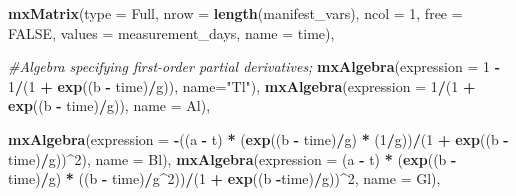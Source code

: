 \documentclass[
12pt, %
twoside,
english]{guelphthesis}
\newenvironment{Shaded}{\begin{snugshade}}{\end{snugshade}}
\newcommand{\AttributeTok}[1]{\textcolor[rgb]{0.13,0.29,0.53}{#1}}
\newcommand{\CommentTok}[1]{\textcolor[rgb]{0.56,0.35,0.01}{\textit{#1}}}
\newcommand{\ConstantTok}[1]{\textcolor[rgb]{0.56,0.35,0.01}{#1}}
\newcommand{\DecValTok}[1]{\textcolor[rgb]{0.00,0.00,0.81}{#1}}
\newcommand{\FunctionTok}[1]{\textcolor[rgb]{0.13,0.29,0.53}{\textbf{#1}}}
\newcommand{\NormalTok}[1]{#1}
\newcommand{\SpecialCharTok}[1]{\textcolor[rgb]{0.81,0.36,0.00}{\textbf{#1}}}
\newcommand{\StringTok}[1]{\textcolor[rgb]{0.31,0.60,0.02}{#1}}
\begin{document}
\begin{Shaded}
\begin{Highlighting}[numbers=left,,]
  \FunctionTok{mxMatrix}\NormalTok{(}\AttributeTok{type =} \StringTok{\textquotesingle{}Full\textquotesingle{}}\NormalTok{, }\AttributeTok{nrow =} \FunctionTok{length}\NormalTok{(manifest\_vars), }\AttributeTok{ncol =} \DecValTok{1}\NormalTok{, }\AttributeTok{free =} \ConstantTok{FALSE}\NormalTok{, }
           \AttributeTok{values =}\NormalTok{ measurement\_days, }\AttributeTok{name =} \StringTok{\textquotesingle{}time\textquotesingle{}}\NormalTok{),}
  
  \CommentTok{\#Algebra specifying first{-}order partial derivatives; }
  \FunctionTok{mxAlgebra}\NormalTok{(}\AttributeTok{expression =} \DecValTok{1} \SpecialCharTok{{-}} \DecValTok{1}\SpecialCharTok{/}\NormalTok{(}\DecValTok{1} \SpecialCharTok{+} \FunctionTok{exp}\NormalTok{((b }\SpecialCharTok{{-}}\NormalTok{ time)}\SpecialCharTok{/}\NormalTok{g)), }\AttributeTok{name=}\StringTok{"Tl"}\NormalTok{),}
  \FunctionTok{mxAlgebra}\NormalTok{(}\AttributeTok{expression =} \DecValTok{1}\SpecialCharTok{/}\NormalTok{(}\DecValTok{1} \SpecialCharTok{+} \FunctionTok{exp}\NormalTok{((b }\SpecialCharTok{{-}}\NormalTok{ time)}\SpecialCharTok{/}\NormalTok{g)), }\AttributeTok{name =} \StringTok{\textquotesingle{}Al\textquotesingle{}}\NormalTok{), }
  
  \FunctionTok{mxAlgebra}\NormalTok{(}\AttributeTok{expression =} \SpecialCharTok{{-}}\NormalTok{((a }\SpecialCharTok{{-}}\NormalTok{ t) }\SpecialCharTok{*}\NormalTok{ (}\FunctionTok{exp}\NormalTok{((b }\SpecialCharTok{{-}}\NormalTok{ time)}\SpecialCharTok{/}\NormalTok{g) }\SpecialCharTok{*}\NormalTok{ (}\DecValTok{1}\SpecialCharTok{/}\NormalTok{g))}\SpecialCharTok{/}\NormalTok{(}\DecValTok{1} \SpecialCharTok{+} \FunctionTok{exp}\NormalTok{((b }\SpecialCharTok{{-}}\NormalTok{ time)}\SpecialCharTok{/}\NormalTok{g))}\SpecialCharTok{\^{}}\DecValTok{2}\NormalTok{), }\AttributeTok{name =} \StringTok{\textquotesingle{}Bl\textquotesingle{}}\NormalTok{),}
  \FunctionTok{mxAlgebra}\NormalTok{(}\AttributeTok{expression =}\NormalTok{  (a }\SpecialCharTok{{-}}\NormalTok{ t) }\SpecialCharTok{*}\NormalTok{ (}\FunctionTok{exp}\NormalTok{((b }\SpecialCharTok{{-}}\NormalTok{ time)}\SpecialCharTok{/}\NormalTok{g) }\SpecialCharTok{*}\NormalTok{ ((b }\SpecialCharTok{{-}}\NormalTok{ time)}\SpecialCharTok{/}\NormalTok{g}\SpecialCharTok{\^{}}\DecValTok{2}\NormalTok{))}\SpecialCharTok{/}\NormalTok{(}\DecValTok{1} \SpecialCharTok{+} \FunctionTok{exp}\NormalTok{((b }\SpecialCharTok{{-}}\NormalTok{time)}\SpecialCharTok{/}\NormalTok{g))}\SpecialCharTok{\^{}}\DecValTok{2}\NormalTok{, }\AttributeTok{name =} \StringTok{\textquotesingle{}Gl\textquotesingle{}}\NormalTok{),}
  

\end{Highlighting}
\end{Shaded}
\end{document}
